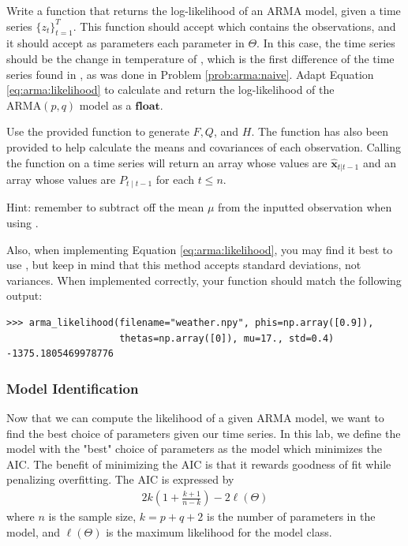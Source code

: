 \begin{problem}
\label{prob:arma:likelihood}
Write a function  that returns the log-likelihood of an ARMA model, given a time series $\{z_t\}_{t=1}^T$.
This function should accept  which contains the observations, and it should accept as parameters each parameter in $\Theta$.
In this case, the time series should be the change in temperature of , which is the first difference of the time series found in , as was done in Problem \ref{prob:arma:naive}.
Adapt Equation \ref{eq:arma:likelihood} to calculate and return the log-likelihood of the $\text{ARMA}(p,q)$ model as a $\mathbf{float}$.

Use the provided  function to generate $F, Q$, and $H$.
The function  has also been provided to help calculate the means and covariances of each observation.
Calling the function  on a time series will return an array whose values are $\hat{\textbf{x}}_{t|t-1}$ and an array whose values are $P_{t\mid t-1}$ for each $t\leq n$.

\noindent Hint: remember to subtract off the mean $\mu$ from the inputted observation when using .

Also, when implementing Equation \ref{eq:arma:likelihood}, you may find it best to use , but keep in mind that this method accepts standard deviations, not variances.
When implemented correctly, your function should match the following output:
\begin{lstlisting}
>>> arma_likelihood(filename="weather.npy", phis=np.array([0.9]),
                    thetas=np.array([0]), mu=17., std=0.4)
-1375.1805469978776
\end{lstlisting}
\end{problem}

\subsubsection*{Model Identification}

Now that we can compute the likelihood of a given ARMA model, we want to find the best choice of parameters given our time series.
In this lab, we define the model with the "best" choice of parameters as the model which minimizes the AIC.
The benefit of minimizing the AIC is that it rewards goodness of fit while penalizing overfitting.
The AIC is expressed by
\begin{align}
\label{eq:AIC:formula}
    2k\left(1 + \frac{k+1}{n-k}\right) - 2 \ell(\Theta)
\end{align}
where $n$ is the sample size, $k = p + q + 2$ is the number of parameters in
the model, and $\ell(\Theta)$ is the maximum likelihood for the model class.

